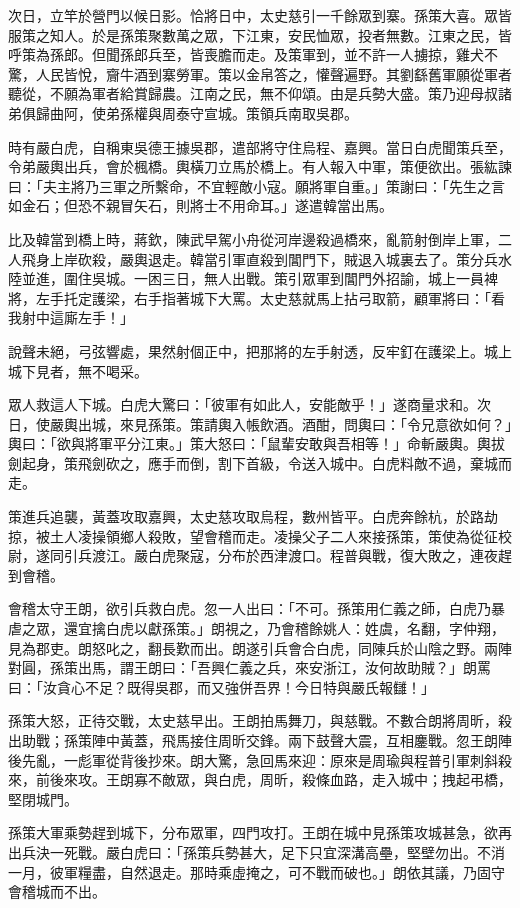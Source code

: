 次日，立竿於營門以候日影。恰將日中，太史慈引一千餘眾到寨。孫策大喜。眾皆服策之知人。於是孫策聚數萬之眾，下江東，安民恤眾，投者無數。江東之民，皆呼策為孫郎。但聞孫郎兵至，皆喪膽而走。及策軍到，並不許一人擄掠，雞犬不驚，人民皆悅，齎牛酒到寨勞軍。策以金帛答之，懽聲遍野。其劉繇舊軍願從軍者聽從，不願為軍者給賞歸農。江南之民，無不仰頌。由是兵勢大盛。策乃迎母叔諸弟俱歸曲阿，使弟孫權與周泰守宣城。策領兵南取吳郡。

時有嚴白虎，自稱東吳德王據吳郡，遣部將守住烏程、嘉興。當日白虎聞策兵至，令弟嚴輿出兵，會於楓橋。輿橫刀立馬於橋上。有人報入中軍，策便欲出。張紘諫曰：「夫主將乃三軍之所繫命，不宜輕敵小寇。願將軍自重。」策謝曰：「先生之言如金石；但恐不親冒矢石，則將士不用命耳。」遂遣韓當出馬。

比及韓當到橋上時，蔣欽，陳武早駕小舟從河岸邊殺過橋來，亂箭射倒岸上軍，二人飛身上岸砍殺，嚴輿退走。韓當引軍直殺到閶門下，賊退入城裏去了。策分兵水陸並進，圍住吳城。一困三日，無人出戰。策引眾軍到閶門外招諭，城上一員裨將，左手托定護梁，右手指著城下大罵。太史慈就馬上拈弓取箭，顧軍將曰：「看我射中這廝左手！」

說聲未絕，弓弦響處，果然射個正中，把那將的左手射透，反牢釘在護梁上。城上城下見者，無不喝采。

眾人救這人下城。白虎大驚曰：「彼軍有如此人，安能敵乎！」遂商量求和。次日，使嚴輿出城，來見孫策。策請輿入帳飲酒。酒酣，問輿曰：「令兄意欲如何？」輿曰：「欲與將軍平分江東。」策大怒曰：「鼠輩安敢與吾相等！」命斬嚴輿。輿拔劍起身，策飛劍砍之，應手而倒，割下首級，令送入城中。白虎料敵不過，棄城而走。

策進兵追襲，黃蓋攻取嘉興，太史慈攻取烏程，數州皆平。白虎奔餘杭，於路劫掠，被土人凌操領鄉人殺敗，望會稽而走。凌操父子二人來接孫策，策使為從征校尉，遂同引兵渡江。嚴白虎聚寇，分布於西津渡口。程普與戰，復大敗之，連夜趕到會稽。

會稽太守王朗，欲引兵救白虎。忽一人出曰：「不可。孫策用仁義之師，白虎乃暴虐之眾，還宜擒白虎以獻孫策。」朗視之，乃會稽餘姚人：姓虞，名翻，字仲翔，見為郡吏。朗怒叱之，翻長歎而出。朗遂引兵會合白虎，同陳兵於山陰之野。兩陣對圓，孫策出馬，謂王朗曰：「吾興仁義之兵，來安浙江，汝何故助賊？」朗罵曰：「汝貪心不足？既得吳郡，而又強併吾界！今日特與嚴氏報讎！」

孫策大怒，正待交戰，太史慈早出。王朗拍馬舞刀，與慈戰。不數合朗將周昕，殺出助戰；孫策陣中黃蓋，飛馬接住周昕交鋒。兩下鼓聲大震，互相鏖戰。忽王朗陣後先亂，一彪軍從背後抄來。朗大驚，急回馬來迎：原來是周瑜與程普引軍刺斜殺來，前後來攻。王朗寡不敵眾，與白虎，周昕，殺條血路，走入城中；拽起弔橋，堅閉城門。

孫策大軍乘勢趕到城下，分布眾軍，四門攻打。王朗在城中見孫策攻城甚急，欲再出兵決一死戰。嚴白虎曰：「孫策兵勢甚大，足下只宜深溝高壘，堅壁勿出。不消一月，彼軍糧盡，自然退走。那時乘虛掩之，可不戰而破也。」朗依其議，乃固守會稽城而不出。

